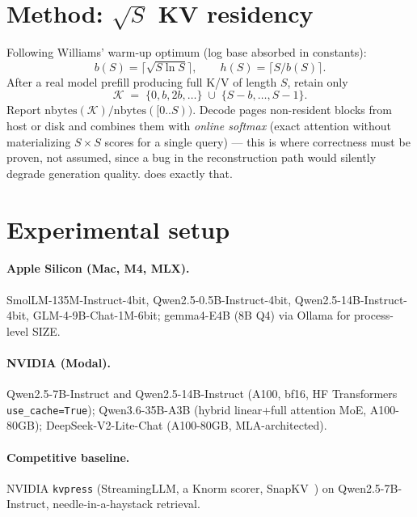 \documentclass[11pt]{article}
\begin{document}
\section{Method: $\sqrt{S}$ KV residency}
\label{sec:method}

Following Williams' warm-up optimum (log base absorbed in constants):
\begin{equation}
  b(S)=\Big\lceil\sqrt{S\ln S}\Big\rceil,\qquad
  h(S)=\Big\lceil S/b(S)\Big\rceil.
\end{equation}
After a real model prefill producing full K/V of length $S$, retain only
\begin{equation}
  \mathcal{K}
  \;=\;
  \{0,b,2b,\ldots\}
  \;\cup\;
  \{S-b,\ldots,S-1\}.
\end{equation}
Report $\mathrm{nbytes}(\mathcal{K})/\mathrm{nbytes}([0..S))$.
Decode pages non-resident blocks from host or disk and combines them with
\emph{online softmax} (exact attention without materializing $S\times S$
scores for a single query) --- this is where correctness must be proven,
not assumed, since a bug in the reconstruction path would silently degrade
generation quality.  does exactly that.

\section{Experimental setup}

\paragraph{Apple Silicon (Mac, M4, MLX).}
SmolLM-135M-Instruct-4bit, Qwen2.5-0.5B-Instruct-4bit, Qwen2.5-14B-Instruct-4bit,
GLM-4-9B-Chat-1M-6bit; gemma4-E4B (8B Q4) via Ollama for process-level SIZE.

\paragraph{NVIDIA (Modal).}
Qwen2.5-7B-Instruct and Qwen2.5-14B-Instruct (A100, bf16, HF Transformers
\texttt{use\_cache=True}); Qwen3.6-35B-A3B (hybrid linear+full attention
MoE, A100-80GB); DeepSeek-V2-Lite-Chat (A100-80GB, MLA-architected).

\paragraph{Competitive baseline.} NVIDIA \texttt{kvpress} (StreamingLLM,
a Knorm scorer, SnapKV~\cite{li2024snapkv,xiao2023streamingllm}) on
Qwen2.5-7B-Instruct, needle-in-a-haystack retrieval.
\end{document}

